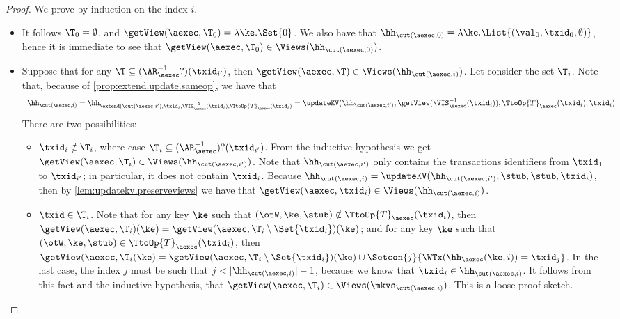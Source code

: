 \begin{proof}
We prove by induction on the index $i$. 
\begin{itemize}
\item {} It follows $\T_{0} = \emptyset$, and $\getView(\aexec, \T_{0}) = \lambda \ke. \Set{0}$. 
We also have that $\hh_{\cut(\aexec, 0)} = \lambda \ke. \List{(\val_0, \txid_{0}, \emptyset)}$, hence 
it is immediate to see that $\getView(\aexec, \T_{0}) \in \Views(\hh_{\cut(\aexec, 0)})$.

\item {}
Suppose that for any $\T \subseteq (\AR_{\aexec}^{-1}?)(\txid_{i'})$, 
then $\getView(\aexec, \T) \in \Views(\hh_{\cut(\aexec, i)})$. 
Let consider the set $\T_{i}$.
Note that, because of \cref{prop:extend.update.sameop}, we have that
\[
\begin{array}{l}
\hh_{\cut(\aexec, i)} =
\hh_{\extend(\cut(\aexec, i'), \txid_{i}, \VIS^{-1}_{\aexec}(\txid_{i}), \TtoOp{T}_{\aexec}(\txid_{i})} 
= \updateKV(\hh_{\cut(\aexec, i')}, \getView(\VIS^{-1}_{\aexec}(\txid_{i})), \TtoOp{T}_{\aexec}(\txid_{i}), \txid_{i})
\end{array}
\]
There are two possibilities:
\begin{itemize}
\item $\txid_{i} \notin \T_{i}$, where case $\T_{i} \subseteq (\AR_{\aexec}^{-1})?(\txid_{i'})$.
From the inductive hypothesis we get $\getView(\aexec, \T_{i}) \in \Views(\hh_{\cut(\aexec, i')})$. 
Note that $\hh_{\cut(\aexec, i')}$ only contains the transactions identifiers from $\txid_{1}$ to $\txid_{i'}$;
in particular, it does not contain $\txid_{i}$. 
Because $\hh_{\cut(\aexec, i)} = \updateKV(\hh_{\cut(\aexec, i')}, \stub, \stub, \txid_{i})$, 
then by \cref{lem:updatekv.preserveviews} we have that $\getView(\aexec, \txid_{i}) \in \Views(\hh_{\cut(\aexec, i)})$.

\item $\txid \in \T_{i}$. Note that for any key $\ke$ such that 
$(\otW, \ke, \stub) \notin \TtoOp{T}_{\aexec}(\txid_{i})$, then 
$\getView(\aexec, \T_{i})(\ke) = \getView(\aexec, \T_{i} \setminus \Set{\txid_{i}})(\ke)$; 
and for any key $\ke$ such that $(\otW, \ke, \stub) \in \TtoOp{T}_{\aexec}(\txid_{i})$, 
then $\getView(\aexec, \T_{i}(\ke) = \getView(\aexec, \T_{i} \setminus \Set{\txid_{i}})(\ke) 
\cup \Setcon{j }{ \WTx(\hh_{\aexec}(\ke, i)) = \txid_{j}}$. 
In the last case, the index $j$ must be such that $j < \lvert \hh_{\cut(\aexec, i)} \rvert - 1$, 
because we know that $\txid_{i} \in \hh_{\cut(\aexec, i)}$. 
It follows from this fact and the inductive hypothesis, 
that $\getView(\aexec, \T_{i}) \in \Views(\mkvs_{\cut(\aexec, i)})$.
\ac{This is a loose proof sketch.} 
\end{itemize}
\end{itemize}
\end{proof}

